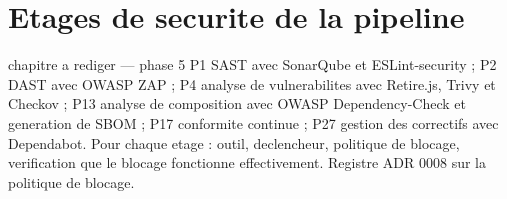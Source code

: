 ﻿%
\chapter{Etages de securite de la pipeline}
\label{chap:stages}

\begin{constat}{chapitre a rediger --- phase 5}
P1 SAST avec SonarQube et ESLint-security ; P2 DAST avec OWASP ZAP ; P4 analyse de vulnerabilites avec Retire.js, Trivy et Checkov ; P13 analyse de composition avec OWASP Dependency-Check et generation de SBOM ; P17 conformite continue ; P27 gestion des correctifs avec Dependabot. Pour chaque etage : outil, declencheur, politique de blocage, verification que le blocage fonctionne effectivement. Registre ADR 0008 sur la politique de blocage.
\end{constat}

